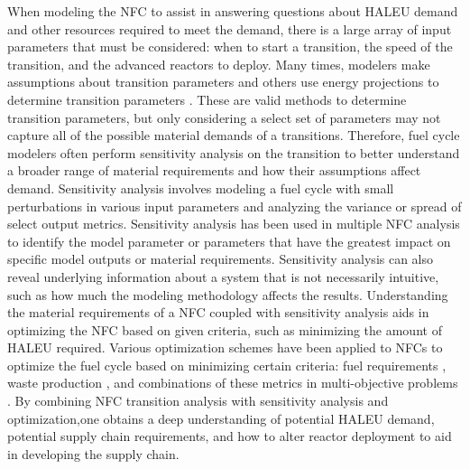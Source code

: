 When modeling the \gls{NFC} to assist in answering questions about 
\gls{HALEU} demand and other resources required to meet the demand, 
there is a large array of input parameters that must be considered: when to start 
a transition, the speed of the 
transition, and the advanced reactors to deploy. Many times, modelers make 
assumptions about transition parameters \cite{sunny_transition_2015, djokic_application_2015}
and others use energy projections to determine transition parameters 
\cite{dixon_estimated_2022}. These are valid methods to determine 
transition parameters, but only considering a select set of parameters may 
not capture all of the possible material demands of a transitions. 
Therefore, fuel cycle modelers often perform sensitivity analysis on 
the transition to better understand a broader range of material 
requirements and how their assumptions affect demand. 
Sensitivity analysis involves 
modeling a fuel cycle with small perturbations in various input 
parameters and analyzing the variance or spread of select output metrics. 
Sensitivity analysis has been used in multiple \gls{NFC} analysis 
\cite{chee_sensitivity_2019,feng_sensitivity_2020,thiolliere_methodology_2018,passerini_sensitivity_2012}
to identify the model parameter or parameters that have the greatest 
impact on specific model outputs or material requirements. Sensitivity 
analysis can also reveal underlying information about a system that is not 
necessarily intuitive, such as how much the modeling methodology 
affects the results. Understanding the 
material requirements of a \gls{NFC} coupled with sensitivity analysis 
aids in optimizing the \gls{NFC} based on given criteria, such as 
minimizing the amount of \gls{HALEU} required. Various 
optimization schemes have been applied to \glspl{NFC} to optimize the fuel 
cycle based on minimizing certain criteria: fuel requirements \cite{kim_selection_1999},
waste production \cite{shwageraus_optimization_2003}, and combinations 
of these metrics in multi-objective 
problems \cite{passerini_systematic_2014}. By combining \gls{NFC} transition 
analysis with sensitivity analysis and optimization,one obtains
a deep understanding of potential \gls{HALEU} demand, potential supply 
chain requirements, and how to alter reactor deployment to aid in developing 
the supply chain. 

